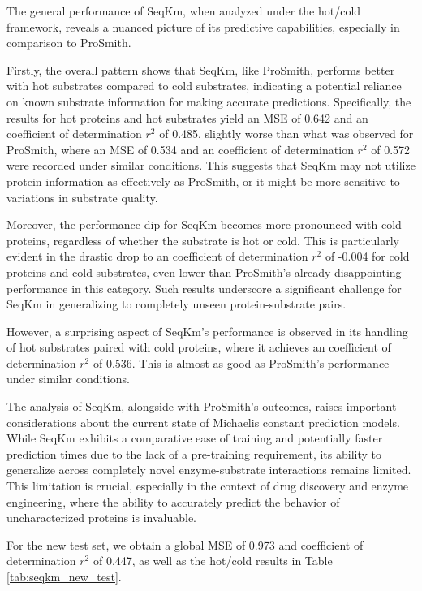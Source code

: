  The general performance of SeqKm, when analyzed under the hot/cold framework, reveals a nuanced picture of its predictive capabilities, especially in comparison to ProSmith.

 Firstly, the overall pattern shows that SeqKm, like ProSmith, performs better with hot substrates compared to cold substrates, indicating a potential reliance on known substrate information for making accurate predictions. Specifically, the results for hot proteins and hot substrates yield an MSE of 0.642 and an coefficient of determination $r^2$ of 0.485, slightly worse than what was observed for ProSmith, where an MSE of 0.534 and an coefficient of determination $r^2$ of 0.572 were recorded under similar conditions. This suggests that SeqKm may not utilize protein information as effectively as ProSmith, or it might be more sensitive to variations in substrate quality.
 
 Moreover, the performance dip for SeqKm becomes more pronounced with cold proteins, regardless of whether the substrate is hot or cold. This is particularly evident in the drastic drop to an coefficient of determination $r^2$ of -0.004 for cold proteins and cold substrates, even lower than ProSmith's already disappointing performance in this category. Such results underscore a significant challenge for SeqKm in generalizing to completely unseen protein-substrate pairs.
 
 However, a surprising aspect of SeqKm's performance is observed in its handling of hot substrates paired with cold proteins, where it achieves an coefficient of determination $r^2$ of 0.536. This is almost as good as ProSmith's performance under similar conditions.
 
 The analysis of SeqKm, alongside with ProSmith's outcomes, raises important considerations about the current state of Michaelis constant prediction models. While SeqKm exhibits a comparative ease of training and potentially faster prediction times due to the lack of a pre-training requirement, its ability to generalize across completely novel enzyme-substrate interactions remains limited. This limitation is crucial, especially in the context of drug discovery and enzyme engineering, where the ability to accurately predict the behavior of uncharacterized proteins is invaluable.

For the new test set, we obtain a global MSE of 0.973 and coefficient of determination $r^2$ of 0.447, as well as the hot/cold results in Table \ref{tab:seqkm_new_test}.

